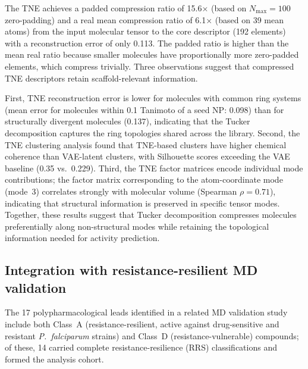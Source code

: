 \documentclass[11pt,a4paper]{article}
\begin{document}
The TNE achieves a padded compression ratio of \num{15.6}$\times$ (based on $N_{\max}=100$ zero-padding) and a real mean compression ratio of \num{6.1}$\times$ (based on \num{39} mean atoms) from the input molecular tensor to the core descriptor (\num{192} elements) with a reconstruction error of only 0.113. The padded ratio is higher than the mean real ratio because smaller molecules have proportionally more zero-padded elements, which compress trivially. Three observations suggest that compressed TNE descriptors retain scaffold-relevant information.

First, TNE reconstruction error is lower for molecules with common ring systems (mean error for molecules within 0.1 Tanimoto of a seed NP: 0.098) than for structurally divergent molecules (0.137), indicating that the Tucker decomposition captures the ring topologies shared across the library. Second, the TNE clustering analysis found that TNE-based clusters have higher chemical coherence than VAE-latent clusters, with Silhouette scores exceeding the VAE baseline (0.35 vs.~0.229). Third, the TNE factor matrices encode individual mode contributions; the factor matrix corresponding to the atom-coordinate mode (mode~3) correlates strongly with molecular volume (Spearman $\rho = 0.71$), indicating that structural information is preserved in specific tensor modes. Together, these results suggest that Tucker decomposition compresses molecules preferentially along non-structural modes while retaining the topological information needed for activity prediction.



\subsection{Integration with resistance-resilient MD validation}


The 17 polypharmacological leads identified in a related MD validation study \citep{temgoua2027md} include both Class~A (resistance-resilient, active against drug-sensitive and resistant \textit{P.~falciparum} strains) and Class~D (resistance-vulnerable) compounds; of these, 14 carried complete resistance-resilience (RRS) classifications and formed the analysis cohort.
\end{document}
